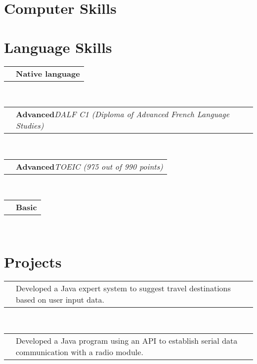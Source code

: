 \documentclass[11pt,a4paper,sans]{moderncv}
\makeatletter
\renewcommand*{\cvlanguage}[3]{%
  \cvline{#1}{\textbf{#2}\hspace*{\separatorcolumnwidth}\emph{#3}}}
\renewcommand*{\cvline}[3][.25em]{%
	  \begin{tabular}{@{}p{\hintscolumnwidth}@{\hspace{\separatorcolumnwidth}}p{\maincolumnwidth}@{}}%
          \centering\hintfont{#2} &{#3}%
	  \end{tabular}\\[#1]}
\makeatother
\begin{document}
\section{Computer Skills}
\SECTIONSPACE
\section{Language Skills}
\cvlanguage{Portuguese}{Native language}{}
\cvlanguage{French}{Advanced}{DALF C1 (Diploma of Advanced French Language Studies)}
\cvlanguage{English}{Advanced}{TOEIC (975 out of 990 points)}
\cvlanguage{Japanese}{Basic}{ }
\SECTIONSPACE
\section{Projects}
\cvline{Artificial Intelligence}{Developed a Java expert system to suggest travel destinations based on user input data.  \newline{\emph{Implemented the forward and backward chaining methods}} \newline{\emph{Designed the graphic user interface in Swing}}\ENTRYSPACE}
\cvline{Data Analysis}{Developed a Java program using an API to establish serial data communication with a radio module.  \newline{\emph{Wrote the documentation and a guide on how to make further improvements}} \newline{\emph{Employed Git version control system}}}
\end{document}
